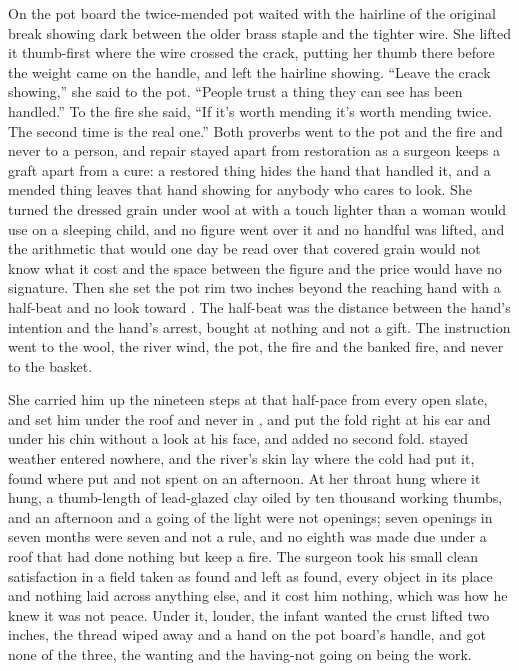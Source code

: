 On the pot board the twice-mended pot waited with the hairline of the original break showing dark between the older brass staple and the tighter wire. She lifted it thumb-first where the wire crossed the crack, putting her thumb there before the weight came on the handle, and left the hairline showing. “Leave the crack showing,” she said to the pot. “People trust a thing they can see has been handled.” To the fire she said, “If it's worth mending it's worth mending twice. The second time is the real one.” Both proverbs went to the pot and the fire and never to a person, and repair stayed apart from restoration as a surgeon keeps a graft apart from a cure: a restored thing hides the hand that handled it, and a mended thing leaves that hand showing for anybody who cares to look. She turned the dressed grain under wool at  with a touch lighter than a woman would use on a sleeping child, and no figure went over it and no handful was lifted, and the arithmetic that would one day be read over that covered grain would not know what it cost and the space between the figure and the price would have no signature. Then she set the pot rim two inches beyond the reaching hand with a half-beat and no look toward . The half-beat was the distance between the hand's intention and the hand's arrest, bought at nothing and not a gift. The instruction went to the wool, the river wind, the pot, the fire and the banked fire, and never to the basket.

She carried him up the nineteen steps at that half-pace from every open slate, and set him under the roof and never in , and put the fold right at his ear and under his chin without a look at his face, and added no second fold.  stayed weather entered nowhere, and the river's skin lay where the cold had put it, found where put and not spent on an afternoon. At her throat  hung where it hung, a thumb-length of lead-glazed clay oiled by ten thousand working thumbs, and an afternoon and a going of the light were not openings; seven openings in seven months were seven and not a rule, and no eighth was made due under a roof that had done nothing but keep a fire. The surgeon took his small clean satisfaction in a field taken as found and left as found, every object in its place and nothing laid across anything else, and it cost him nothing, which was how he knew it was not peace. Under it, louder, the infant wanted the crust lifted two inches, the thread wiped away and a hand on the pot board's handle, and got none of the three, the wanting and the having-not going on being the work.


